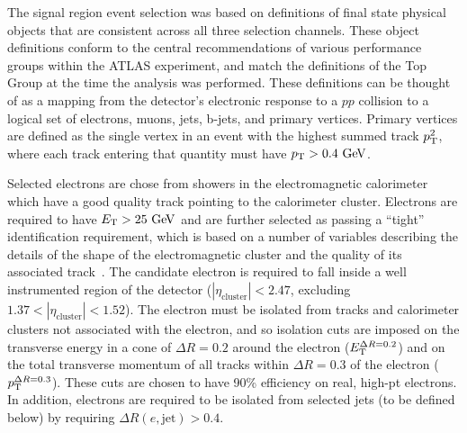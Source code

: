 The signal region event selection was based on definitions of final state physical objects that are consistent across all three selection channels.
These object definitions conform to the central recommendations of various performance groups within the ATLAS experiment, and match the definitions of the Top Group at the time the analysis was performed.
These definitions can be thought of as a mapping from the detector's electronic response to a $pp$ collision to a logical set of electrons, muons, jets, b-jets, and primary vertices.
Primary vertices are defined as the single vertex in an event with the highest summed track $p_{\mathrm{T}}^2$, where each track entering that quantity must have $\pT>0.4 \GeV{}$.


Selected electrons are chose from showers in the electromagnetic calorimeter which have a good quality track pointing to the calorimeter cluster.
Electrons are required to have $\ET>25 \GeV$ and are further selected as passing a ``tight'' identification requirement, which is based on a number of variables describing the details of the shape of the electromagnetic cluster and the quality of its associated track~\cite{Aad:2011mk}.
The candidate electron is required to fall inside a well instrumented region of the detector ($|\eta_\mathrm{cluster}|<2.47$, excluding $1.37<|\eta_\mathrm{cluster}|<1.52$).
The electron must be isolated from tracks and calorimeter clusters not associated with the electron, and so isolation cuts are imposed on the transverse energy in a cone of $\Delta R = 0.2$ around the electron ($E_{\mathrm{T}}^{\Delta R=0.2}$) and on the total transverse momentum of all tracks within $\Delta R = 0.3$ of the electron ($p_{\mathrm{T}}^{\Delta R=0.3}$).
These cuts are chosen to have 90\% efficiency on real, high-pt electrons.
In addition, electrons are required to be isolated from selected jets (to be defined below) by requiring $\Delta R(e,\mathrm{jet})>0.4$. 

